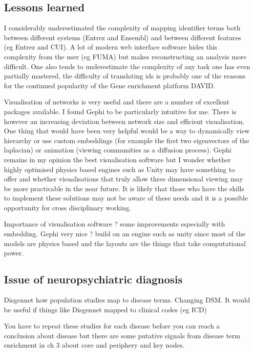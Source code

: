  

 \subsection{Lessons learned}
 
 I considerably underestimated the complexity of mapping identifier terms both between different systems (Entrez and Ensembl) and between different features (eg Entrez and CUI). A lot of modern web interface software hides this complexity from the user (eg FUMA) but makes reconstructing an analysis more difficult. One also tends to underestimate the complexity of any task one has even partially mastered, the difficulty of translating ids is probably one of the reasons for the continued popularity of the Gene enrichment platform DAVID. 
 
 Visualisation of networks is very useful and there are a number of excellent packages available. I found Gephi to be particularly intuitive for me. There is however an increasing deviation between network size and efficient visualisation. One thing that would have been very helpful would be a way to dynamically view hierarchy or use custom embeddings (for example the first two eigenvectors of the laplacian) or animation (viewing communities as a diffusion process). Gephi remains in my opinion the best visualisation software but I wonder whether highly optimised physics based engines such as Unity may have something to offer and whether visualisations that truly allow three dimensional viewing may be more practicable in the near future. It is likely that those who have the skills to implement these solutions may not be aware of these needs and it is a possible opportunity for cross disciplinary working. 
 
 
 
 
 
 Importance of visualisation software ? some improvements especially with embedding. Gephi very nice ? build on an engine such as unity since most of the models are physics based and the layouts are the things that take computational power.
 

 
 \subsection{Issue of neuropsychiatric diagnosis}
 Disgennet how population studies map to disease terms. Changing DSM. It would be useful if things like Disgennet mapped to clinical codes (eg ICD) 
 
 You have to repeat these studies for each disease before you can reach a conclusion about disease but there are some putative signals from disease term enrichment in ch 3 about core and periphery and key nodes. 
 
